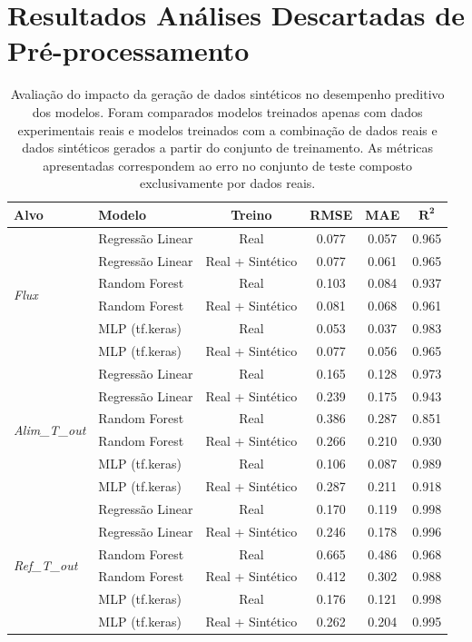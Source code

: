 \chapter{Resultados Análises Descartadas de Pré-processamento}
\label{apendice}

\begin{table}[H]
\centering
\caption{Avaliação do impacto da geração de dados sintéticos no desempenho preditivo dos modelos. Foram comparados modelos treinados apenas com dados experimentais reais e modelos treinados com a combinação de dados reais e dados sintéticos gerados a partir do conjunto de treinamento. As métricas apresentadas correspondem ao erro no conjunto de teste composto exclusivamente por dados reais.}
\label{tab:avaliacao_data_augmentation}
\small
\setlength{\tabcolsep}{6pt}
\begin{tabular}{llcccc}
\toprule
\textbf{Alvo} & \textbf{Modelo} & \textbf{Treino} & \textbf{RMSE} & \textbf{MAE} & $\boldsymbol{R^2}$ \\
\midrule

\multirow{6}{*}{\textit{Flux}}
 & Regressão Linear & Real & 0.077 & 0.057 & 0.965 \\
 & Regressão Linear & Real + Sintético & 0.077 & 0.061 & 0.965 \\
 & Random Forest & Real & 0.103 & 0.084 & 0.937 \\
 & Random Forest & Real + Sintético & 0.081 & 0.068 & 0.961 \\
 & MLP (tf.keras) & Real & 0.053 & 0.037 & 0.983 \\
 & MLP (tf.keras) & Real + Sintético & 0.077 & 0.056 & 0.965 \\
\midrule

\multirow{6}{*}{\textit{Alim\_T\_out}}
 & Regressão Linear & Real & 0.165 & 0.128 & 0.973 \\
 & Regressão Linear & Real + Sintético & 0.239 & 0.175 & 0.943 \\
 & Random Forest & Real & 0.386 & 0.287 & 0.851 \\
 & Random Forest & Real + Sintético & 0.266 & 0.210 & 0.930 \\
 & MLP (tf.keras) & Real & 0.106 & 0.087 & 0.989 \\
 & MLP (tf.keras) & Real + Sintético & 0.287 & 0.211 & 0.918 \\
\midrule

\multirow{6}{*}{\textit{Ref\_T\_out}}
 & Regressão Linear & Real & 0.170 & 0.119 & 0.998 \\
 & Regressão Linear & Real + Sintético & 0.246 & 0.178 & 0.996 \\
 & Random Forest & Real & 0.665 & 0.486 & 0.968 \\
 & Random Forest & Real + Sintético & 0.412 & 0.302 & 0.988 \\
 & MLP (tf.keras) & Real & 0.176 & 0.121 & 0.998 \\
 & MLP (tf.keras) & Real + Sintético & 0.262 & 0.204 & 0.995 \\
\bottomrule
\end{tabular}
\end{table}


